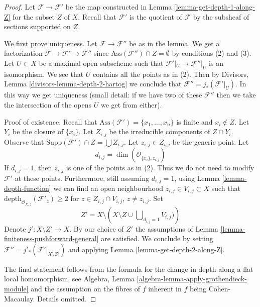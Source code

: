\begin{proof}
Let $\mathcal{F} \to \mathcal{F}'$ be the map constructed in
Lemma \ref{lemma-get-depth-1-along-Z} for the subset $Z$ of $X$.
Recall that $\mathcal{F}'$ is the quotient of $\mathcal{F}$
by the subsheaf of sections supported on $Z$.

\medskip\noindent
We first prove uniqueness. Let $\mathcal{F} \to \mathcal{F}''$
be as in the lemma. We get a factorization
$\mathcal{F} \to \mathcal{F}' \to \mathcal{F}''$
since $\text{Ass}(\mathcal{F}'') \cap Z = \emptyset$
by conditions (2) and (3). Let $U \subset X$ be a maximal open
subscheme such that $\mathcal{F}'|_U \to \mathcal{F}''|_U$
is an isomorphism. We see that $U$ contains all the points
as in (2). Then by Divisors, Lemma \ref{divisors-lemma-depth-2-hartog}
we conclude that $\mathcal{F}'' = j_*(\mathcal{F}'|_U)$.
In this way we get uniqueness (small detail: if we have two
of these $\mathcal{F}''$ then we take the intersection of the opens $U$
we get from either).

\medskip\noindent
Proof of existence. Recall that
$\text{Ass}(\mathcal{F}') = \{x_1, \ldots, x_n\}$
is finite and $x_i \not \in Z$.
Let $Y_i$ be the closure of $\{x_i\}$. Let
$Z_{i, j}$ be the irreducible components of $Z \cap Y_i$.
Observe that $\text{Supp}(\mathcal{F}') \cap Z = \bigcup Z_{i, j}$.
Let $z_{i, j} \in Z_{i, j}$ be the generic point.
Let
$$
d_{i, j} = \dim(\mathcal{O}_{\overline{\{x_i\}}, z_{i, j}})
$$
If $d_{i, j} = 1$, then $z_{i, j}$ is one of the points as in (2).
Thus we do not need to modify $\mathcal{F}'$ at these points.
Furthermore, still assuming $d_{i, j} = 1$, using
Lemma \ref{lemma-depth-function}
we can find an open neighbourhood
$z_{i, j} \in V_{i, j} \subset X$ such that
$\text{depth}_{\mathcal{O}_{X, z}}(\mathcal{F}'_z) \geq 2$
for $z \in Z_{i, j} \cap V_{i, j}$, $z \not = z_{i, j}$.
Set
$$
Z' = X \setminus
\left(
X \setminus Z \cup \bigcup\nolimits_{d_{i, j} = 1} V_{i, j})
\right)
$$
Denote $j' : X \setminus Z' \to X$. By our choice of $Z'$
the assumptions of Lemma \ref{lemma-finiteness-pushforward-general}
are satisfied.
We conclude by setting $\mathcal{F}'' = j'_*(\mathcal{F}'|_{X \setminus Z'})$
and applying Lemma \ref{lemma-get-depth-2-along-Z}.

\medskip\noindent
The final statement follows from the formula for the change in
depth along a flat local homomorphism, see
Algebra, Lemma \ref{algebra-lemma-apply-grothendieck-module}
and the assumption on the fibres of $f$ inherent in $f$ being
Cohen-Macaulay. Details omitted.
\end{proof}

